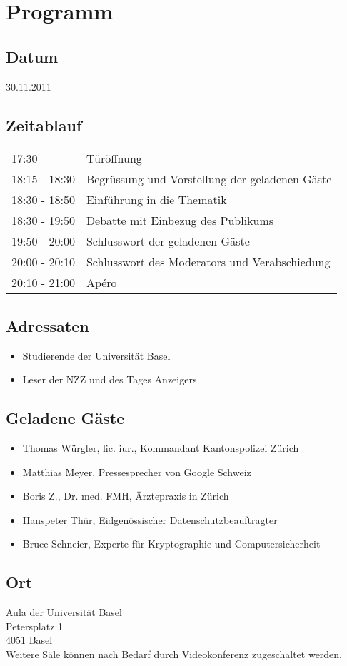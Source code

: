 \section{Programm}
\subsection*{Datum}
30.11.2011

\subsection*{Zeitablauf}
\begin{tabular}{ll}
17:30	& Türöffnung\\
18:15 - 18:30 & Begrüssung und Vorstellung der geladenen Gäste \\
18:30 - 18:50 & Einführung in die Thematik \\
18:30 - 19:50 & Debatte mit Einbezug des Publikums\\
19:50 - 20:00 & Schlusswort der geladenen Gäste\\
20:00 - 20:10 & Schlusswort des Moderators und Verabschiedung\\
20:10 - 21:00 & Apéro\\
\end{tabular}

\subsection*{Adressaten}
\begin{itemize}
 \item Studierende der Universität Basel
 \item Leser der NZZ und des Tages Anzeigers
\end{itemize}


\subsection*{Geladene Gäste}
\begin{itemize}
\item Thomas Würgler, lic. iur., Kommandant Kantonspolizei Zürich
\item Matthias Meyer, Pressesprecher von Google Schweiz
\item Boris Z., Dr. med. FMH, Ärztepraxis in Zürich
\item Hanspeter Thür, Eidgenössischer Datenschutzbeauftragter
\item Bruce Schneier, Experte für Kryptographie und Computersicherheit
\end{itemize}

\subsection*{Ort}
Aula der Universit\"at Basel\\
Petersplatz 1\\
4051 Basel\\
\newline
Weitere S\"ale k\"onnen nach Bedarf durch Videokonferenz zugeschaltet werden.
